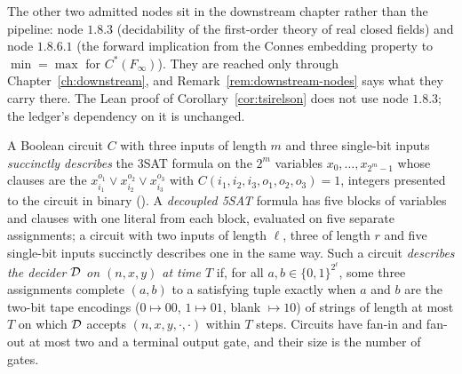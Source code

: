 \begin{remark}
The other two admitted nodes sit in the downstream chapter rather than the pipeline: node
$1.8.3$ (decidability of the first-order theory of real closed fields) and node $1.8.6.1$
(the forward implication from the Connes embedding property to $\min = \max$ for
$C^*(F_\infty)$). They are reached only through Chapter~\ref{ch:downstream}, and
Remark~\ref{rem:downstream-nodes} says what they carry there. The Lean proof of
Corollary~\ref{cor:tsirelson} does not use node $1.8.3$; the ledger's dependency on it is
unchanged.
\end{remark}

\begin{definition}
\label{def:succinct-3sat}
\leanok
A Boolean circuit $C$ with three inputs of length $m$ and three single-bit inputs
\emph{succinctly describes} the 3SAT formula on the $2^m$ variables $x_0, \ldots,
x_{2^m - 1}$ whose clauses are the $x_{i_1}^{o_1} \vee x_{i_2}^{o_2} \vee x_{i_3}^{o_3}$
with $C(i_1, i_2, i_3, o_1, o_2, o_3) = 1$, integers presented to the circuit in binary
(\cite[Definition of succinct descriptions of 3SAT formulas, Section 10]{JNVWY20}). A
\emph{decoupled 5SAT} formula has five blocks of variables and clauses with one literal from
each block, evaluated on five separate assignments; a circuit with two inputs of length
$\ell$, three of length $r$ and five single-bit inputs succinctly describes one in the same
way. Such a circuit \emph{describes the decider $\mathcal{D}$ on $(n, x, y)$ at time $T$} if,
for all $a, b \in \{0,1\}^{2^\ell}$, some three assignments complete $(a, b)$ to a
satisfying tuple exactly when $a$ and $b$ are the two-bit tape encodings ($0 \mapsto 00$,
$1 \mapsto 01$, blank $\mapsto 10$) of strings of length at most $T$ on which $\mathcal{D}$
accepts $(n, x, y, \cdot, \cdot)$ within $T$ steps. Circuits have fan-in and fan-out at most
two and a terminal output gate, and their size is the number of gates.
\end{definition}

